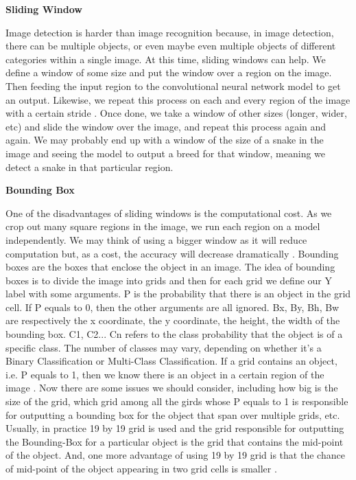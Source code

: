 \documentclass{article}
\begin{document}
\textbf{Sliding Window}

Image detection is harder than image recognition because, in image detection, there can be multiple objects, or even maybe even multiple objects of different categories within a single image. At this time, sliding windows can help. We define a window of some size and put the window over a region on the image. Then feeding the input region to the convolutional neural network model to get an output. Likewise, we repeat this process on each and every region of the image with a certain stride \cite{lampert2008beyond}. Once done, we take a window of other sizes (longer, wider, etc) and slide the window over the image, and repeat this process again and again. We may probably end up with a window of the size of a snake in the image and seeing the model to output a breed for that window, meaning we detect a snake in that particular region.

\textbf{Bounding Box}

One of the disadvantages of sliding windows is the computational cost. As we crop out many square regions in the image, we run each region on a model independently. We may think of using a bigger window as it will reduce computation but, as a cost, the accuracy will decrease dramatically \cite{fowers2012performance}. Bounding boxes are the boxes that enclose the object in an image. The idea of bounding boxes is to divide the image into grids and then for each grid we define our Y label with some arguments. P is the probability that there is an object in the grid cell. If P equals to 0, then the other arguments are all ignored. Bx, By, Bh, Bw are respectively the x coordinate, the y coordinate, the height, the width of the bounding box. C1, C2... Cn refers to the class probability that the object is of a specific class. The number of classes may vary, depending on whether it’s a Binary Classification or Multi-Class Classification. If a grid contains an object, i.e. P equals to 1, then we know there is an object in a certain region of the image \cite{lempitsky2009image}. Now there are some issues we should consider, including how big is the size of the grid, which grid among all the girds whose P equals to 1 is responsible for outputting a bounding box for the object that span over multiple grids, etc. Usually, in practice 19 by 19 grid is used and the grid responsible for outputting the Bounding-Box for a particular object is the grid that contains the mid-point of the object. And, one more advantage of using 19 by 19 grid is that the chance of mid-point of the object appearing in two grid cells is smaller \cite{hillis2010bounding}.
\end{document}
